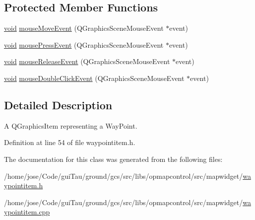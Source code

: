 \subsection*{Protected Member Functions}
\begin{DoxyCompactItemize}
\item 
\hyperlink{group___u_a_v_objects_plugin_ga444cf2ff3f0ecbe028adce838d373f5c}{void} \hyperlink{group___o_p_map_widget_ga6f89cd987bfc43501b2d48b05a98e542}{mouse\-Move\-Event} (Q\-Graphics\-Scene\-Mouse\-Event $\ast$event)
\item 
\hyperlink{group___u_a_v_objects_plugin_ga444cf2ff3f0ecbe028adce838d373f5c}{void} \hyperlink{group___o_p_map_widget_ga75c88df34476dc60c89f8611fec5868b}{mouse\-Press\-Event} (Q\-Graphics\-Scene\-Mouse\-Event $\ast$event)
\item 
\hyperlink{group___u_a_v_objects_plugin_ga444cf2ff3f0ecbe028adce838d373f5c}{void} \hyperlink{group___o_p_map_widget_gab66a8c1572009dbf0caad4c9a0109cfa}{mouse\-Release\-Event} (Q\-Graphics\-Scene\-Mouse\-Event $\ast$event)
\item 
\hyperlink{group___u_a_v_objects_plugin_ga444cf2ff3f0ecbe028adce838d373f5c}{void} \hyperlink{group___o_p_map_widget_ga8e95fece0c41ca37ee7878e84a03e700}{mouse\-Double\-Click\-Event} (Q\-Graphics\-Scene\-Mouse\-Event $\ast$event)
\end{DoxyCompactItemize}


\subsection{Detailed Description}
A Q\-Graphics\-Item representing a Way\-Point. 

Definition at line 54 of file waypointitem.\-h.



The documentation for this class was generated from the following files\-:\begin{DoxyCompactItemize}
\item 
/home/jose/\-Code/gui\-Tau/ground/gcs/src/libs/opmapcontrol/src/mapwidget/\hyperlink{waypointitem_8h}{waypointitem.\-h}\item 
/home/jose/\-Code/gui\-Tau/ground/gcs/src/libs/opmapcontrol/src/mapwidget/\hyperlink{waypointitem_8cpp}{waypointitem.\-cpp}\end{DoxyCompactItemize}
